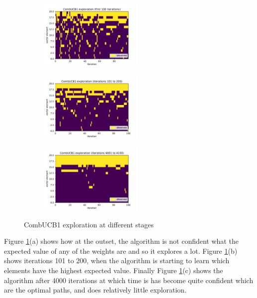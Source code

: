 \begin{figure}[ht!]
\centering
\begin{subfigure}{.33\textwidth}
  \centering
  \includegraphics[width=50mm]{../plots/basicCombUCB1_100iters.pdf}
  \caption{}
\end{subfigure}%
\begin{subfigure}{.33\textwidth}
  \centering
  \includegraphics[width=50mm]{../plots/basicCombUCB1_100_200iters.pdf}
  \caption{}
\end{subfigure}
\begin{subfigure}{.33\textwidth}
  \centering
  \includegraphics[width=50mm]{../plots/basicCombUCB1_4000_4100iters.pdf}
  \caption{}
\end{subfigure}
\caption{CombUCB1 exploration at different stages}
\label{fig:combucb1_basic}
\end{figure}

\noindent Figure \ref{fig:combucb1_basic}(a) shows how at the outset, the algorithm is not confident what the expected value of any of the weights are and so it explores a lot. Figure \ref{fig:combucb1_basic}(b) shows iterations 101 to 200, when the algorithm is starting to learn which elements have the highest expected value. Finally Figure \ref{fig:combucb1_basic}(c) shows the algorithm after 4000 iterations at which time is has become quite confident which are the optimal paths, and does relatively little exploration.\\

